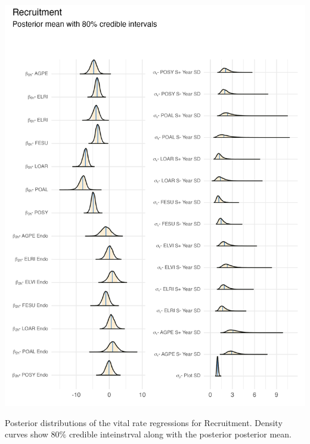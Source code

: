 \documentclass[lineno, sn-basic]{sn-jnl}%
\providecommand{\DIFaddbegin}{} %
\providecommand{\DIFaddend}{} %
\providecommand{\DIFdelbegin}{} %
\providecommand{\DIFdelend}{} %
\providecommand{\DIFaddbeginFL}{} %
\providecommand{\DIFaddendFL}{} %
\providecommand{\DIFdelbeginFL}{} %
\providecommand{\DIFdelendFL}{} %
\newcommand{\DIFscaledelfig}{0.5}
\newlength{\DIFdelgraphicswidth} %
\newlength{\DIFdelgraphicsheight} %
\newcommand{\DIFaddincludegraphics}[2][]{{\color{blue}\fbox{\DIFOincludegraphics[#1]{#2}}}} %
\newcommand{\DIFdelincludegraphics}[2][]{%
\sbox{\DIFdelgraphicsbox}{\DIFOincludegraphics[#1]{#2}}%
\settoboxwidth{\DIFdelgraphicswidth}{\DIFdelgraphicsbox} %
\settoboxtotalheight{\DIFdelgraphicsheight}{\DIFdelgraphicsbox} %
\scalebox{\DIFscaledelfig}{%
\parbox[b]{\DIFdelgraphicswidth}{\usebox{\DIFdelgraphicsbox}\\[-\baselineskip] \rule{\DIFdelgraphicswidth}{0em}}\llap{\resizebox{\DIFdelgraphicswidth}{\DIFdelgraphicsheight}{%
\setlength{\unitlength}{\DIFdelgraphicswidth}%
\begin{picture}(1,1)%
\thicklines\linethickness{2pt} %
{\color[rgb]{1,0,0}\put(0,0){\framebox(1,1){}}}%
{\color[rgb]{1,0,0}\put(0,0){\line( 1,1){1}}}%
{\color[rgb]{1,0,0}\put(0,1){\line(1,-1){1}}}%
\end{picture}%
}\hspace*{3pt}}} %
} %
\DeclareRobustCommand{\DIFaddbegin}{\DIFOaddbegin \let\includegraphics\DIFaddincludegraphics} %
\DeclareRobustCommand{\DIFaddend}{\DIFOaddend \let\includegraphics\DIFOincludegraphics} %
\DeclareRobustCommand{\DIFdelbegin}{\DIFOdelbegin \let\includegraphics\DIFdelincludegraphics} %
\DeclareRobustCommand{\DIFdelend}{\DIFOaddend \let\includegraphics\DIFOincludegraphics} %
\DeclareRobustCommand{\DIFaddbeginFL}{\DIFOaddbeginFL \let\includegraphics\DIFaddincludegraphics} %
\DeclareRobustCommand{\DIFaddendFL}{\DIFOaddendFL \let\includegraphics\DIFOincludegraphics} %
\DeclareRobustCommand{\DIFdelbeginFL}{\DIFOdelbeginFL \let\includegraphics\DIFdelincludegraphics} %
\DeclareRobustCommand{\DIFdelendFL}{\DIFOaddendFL \let\includegraphics\DIFOincludegraphics} %
\begin{document}
\DIFdelbegin %
\DIFdelendFL \DIFaddbeginFL \begin{myfigure}[H]
	\DIFaddendFL \centering
	\includegraphics[width = \linewidth]{stos_posteriors_plot.png}
	\DIFdelbeginFL %
\DIFdelendFL \DIFaddbeginFL \caption[Posterior distributions of the vital rate regressions for Recruitment]{\DIFaddendFL Posterior distributions of the vital rate regressions for Recruitment. Density curves show $80\%$ credible inteinstrval along with the posterior posterior mean.}
\DIFdelbeginFL %
\DIFdelend \DIFaddbegin \end{myfigure}
\DIFaddend 
\end{document}

